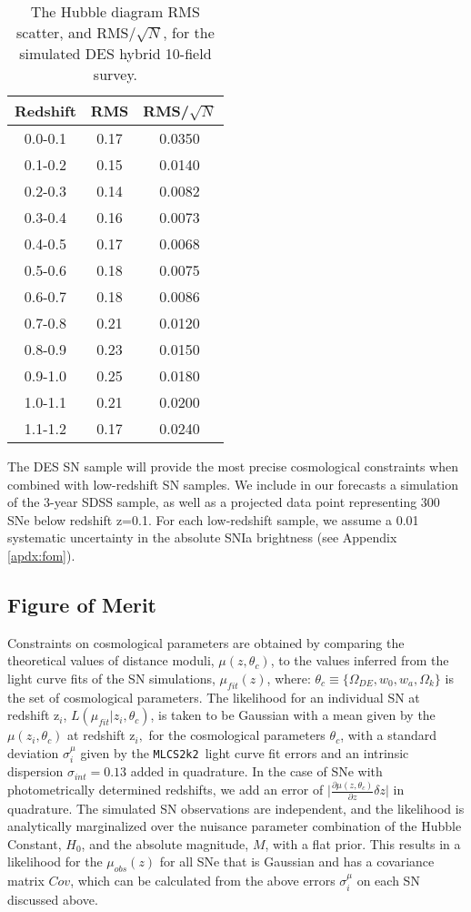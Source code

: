 \documentclass[preprint2]{aastex}    %
\newcommand{\mlcs}{{\tt MLCS2k2}}
\begin{document}
\begin{table}[ht]
\centering%
\begin{tabular}
[c]{|c|c|c|}\hline
Redshift & RMS & RMS/$\sqrt{N}$\\
\hline
0.0-0.1 & 0.17 & 0.0350 \\
0.1-0.2 & 0.15 & 0.0140 \\
0.2-0.3 & 0.14 & 0.0082 \\
0.3-0.4 & 0.16 & 0.0073 \\
0.4-0.5 & 0.17 & 0.0068 \\
0.5-0.6 & 0.18 & 0.0075 \\
0.6-0.7 & 0.18 & 0.0086 \\
0.7-0.8 & 0.21 & 0.0120 \\
0.8-0.9 & 0.23 & 0.0150 \\
0.9-1.0 & 0.25 & 0.0180 \\
1.0-1.1 & 0.21 & 0.0200 \\
1.1-1.2 & 0.17 & 0.0240 \\
\hline
\end{tabular}
\caption{The Hubble diagram RMS scatter, and RMS/$\sqrt{N}$, for the 
simulated DES hybrid 10-field survey.}
\label{tab:hubresid}%
\end{table}

The DES SN sample will provide the most precise cosmological constraints 
when combined with low-redshift SN samples.  We include in our forecasts a simulation
of the 3-year SDSS sample, as well as a projected data point representing 300 SNe
below redshift z=0.1. For each low-redshift sample, we assume a 0.01 systematic 
uncertainty in the absolute SNIa brightness (see Appendix \ref{apdx:fom}). 

\subsection{Figure of Merit}\label{sec:fom}
Constraints on cosmological parameters are
obtained by comparing the theoretical values of distance moduli,
$\mu(z,\theta_c)$, to the values inferred from the light
curve fits of the SN simulations, $\mu_{fit}(z)$, where:
$\theta_{c} \equiv \{\Omega_{DE},w_0, w_a,\Omega_k\}$ is the set of
cosmological parameters.
The likelihood for an individual
SN at redshift z$_i$, $L(\mu_{fit} \vert z_i, \theta_c)$, is taken to be
Gaussian with a mean given by the $\mu(z_i,\theta_c)$ at redshift z$_i,$
for the cosmological parameters $\theta_c$, with a standard deviation $\sigma^\mu_i$ 
given by the \mlcs\
light curve fit errors and an intrinsic
dispersion $\sigma_{int}=0.13$ added in quadrature. In the case of SNe
 with photometrically determined redshifts, we add an error of
$\vert\frac{\partial \mu(z,\theta_c)}{\partial z}\delta z\vert$ in quadrature.
The simulated SN observations are independent, and the likelihood is analytically 
marginalized over the nuisance parameter combination of the Hubble
Constant, $H_0$, and the absolute magnitude, $M$, with a flat prior.
This results in a likelihood for the $\mu_{obs}(z)$ for all SNe
that is Gaussian and has a covariance matrix $Cov$, which can be
calculated from the above errors $\sigma^\mu_i$ on each SN discussed
above.
\end{document}
